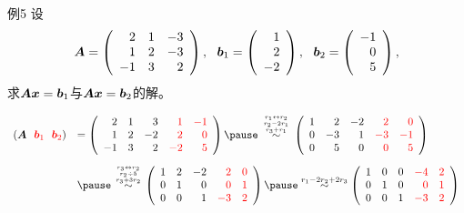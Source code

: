 \begin{frame}
  \begin{footnotesize}
    \begin{exampleblock}{例5}
      设
      $$
      \boldsymbol{A} = \left(
      \begin{array}{rrr}
        2&1&-3\\
        1&2&-3\\
        -1&3&2
      \end{array}
      \right),
      ~~
      {\boldsymbol{b}}_1=\left(
      \begin{array}{r}
        1\\
        2\\
        -2
      \end{array}
      \right),
      ~~
      {\boldsymbol{b}}_2=\left(
      \begin{array}{r}
        -1\\
         0\\
         5
      \end{array}
      \right),
      $$
      求$\boldsymbol{A}{\boldsymbol{x}}={\boldsymbol{b}}_1$与$\boldsymbol{A}{\boldsymbol{x}}={\boldsymbol{b}}_2$的解。
    \end{exampleblock}
    \pause 
    \jiename  
    $$
    \begin{array}{rl}
      (\A~~\red{\bb_1}~~\red{\bb_2}) &= \left(
      \begin{array}{rrrrr}
        2 & 1 & 3 &\red{ 1} & \red{-1}\\
        1 & 2 &-2 &\red{ 2} & \red{ 0}\\
       -1 & 3 & 2 &\red{-2} & \red{ 5}        
      \end{array}
      \right) \pause  \overset{{r_1\leftrightarrow r_2 \atop r_2-2r_1}\atop  r_3+r_1}{\sim}
      \left(
      \begin{array}{rrrrr}
        1 & 2 &-2 & \red{ 2} & \red{ 0}\\
        0 &-3 & 1 & \red{-3} & \red{-1}\\
        0 & 5 & 0 & \red{ 0} & \red{ 5}        
      \end{array}
      \right) \\[0.3in]
      &\pause \overset{{r_3\leftrightarrow r_2 \atop r_2\div5}\atop  r_3+3r_2}{\sim}
      \left(
      \begin{array}{rrrrr}
        1 & 2 &-2 &\red{ 2} &  \red{0}\\
        0 & 1 & 0 &\red{ 0} &  \red{1}\\
        0 & 0 & 1 &\red{-3} &  \red{2}        
      \end{array}
      \right) \pause  \overset{r_1-2r_2+2r_3}{\sim}
            \left(
      \begin{array}{rrrrr}
        1 & 0 & 0 & \red{-4} & \red{2}\\
        0 & 1 & 0 & \red{0} &  \red{1}\\
        0 & 0 & 1 & \red{-3} &  \red{2}        
      \end{array}
      \right) 
    \end{array}
    $$
  \end{footnotesize}
\end{frame}

